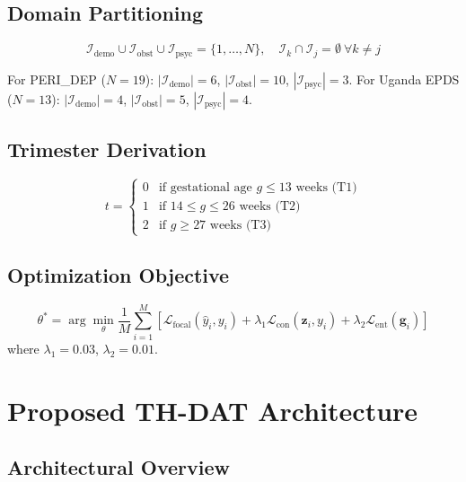 \documentclass[12pt,a4paper]{article}
\begin{document}
\subsection{Domain Partitioning}
\begin{equation}
\mathcal{I}_{\text{demo}} \cup \mathcal{I}_{\text{obst}} \cup \mathcal{I}_{\text{psyc}} = \{1, \ldots, N\}, \quad \mathcal{I}_k \cap \mathcal{I}_j = \emptyset \ \forall k \neq j
\end{equation}

For PERI\_DEP ($N=19$): $|\mathcal{I}_{\text{demo}}| = 6$, $|\mathcal{I}_{\text{obst}}| = 10$, $|\mathcal{I}_{\text{psyc}}| = 3$. For Uganda EPDS ($N=13$): $|\mathcal{I}_{\text{demo}}| = 4$, $|\mathcal{I}_{\text{obst}}| = 5$, $|\mathcal{I}_{\text{psyc}}| = 4$.

\subsection{Trimester Derivation}
\begin{equation}
t = \begin{cases} 0 & \text{if gestational age } g \leq 13 \text{ weeks (T1)} \\ 1 & \text{if } 14 \leq g \leq 26 \text{ weeks (T2)} \\ 2 & \text{if } g \geq 27 \text{ weeks (T3)} \end{cases}
\end{equation}

\subsection{Optimization Objective}
\begin{equation}
\theta^* = \arg\min_\theta \frac{1}{M} \sum_{i=1}^{M} \left[ \mathcal{L}_{\text{focal}}(\hat{y}_i, y_i) + \lambda_1 \mathcal{L}_{\text{con}}(\mathbf{z}_i, y_i) + \lambda_2 \mathcal{L}_{\text{ent}}(\mathbf{g}_i) \right]
\end{equation}
where $\lambda_1 = 0.03$, $\lambda_2 = 0.01$.

\section{Proposed TH-DAT Architecture}

\subsection{Architectural Overview}
\end{document}
